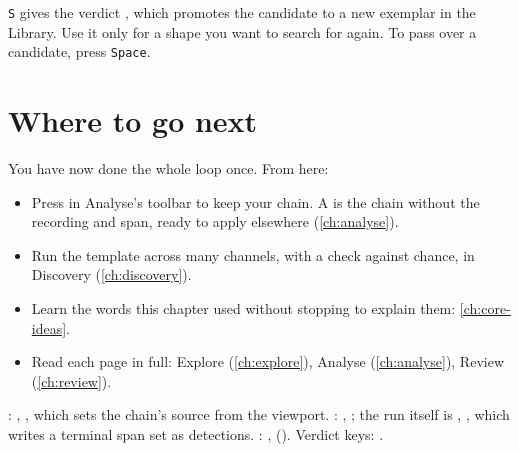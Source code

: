 
\begin{watchout}
\texttt{S} gives the verdict , which promotes the candidate to a new exemplar in
the Library. Use it only for a shape you want to search for again. To pass over a
candidate, press \texttt{Space}.
\end{watchout}

\section{Where to go next}\label{sec:first-session-next}
You have now done the whole loop once. From here:
\begin{itemize}
  \item Press  in Analyse's toolbar to keep your chain. A
     is the chain without the recording and span, ready to apply
    elsewhere (\cref{ch:analyse}).
  \item Run the template across many channels, with a check against chance, in Discovery
    (\cref{ch:discovery}).
  \item Learn the words this chapter used without stopping to explain them:
    \cref{ch:core-ideas}.
  \item Read each page in full: Explore (\cref{ch:explore}), Analyse (\cref{ch:analyse}),
    Review (\cref{ch:review}).
\end{itemize}

\begin{underthehood}
: , ,
which sets the chain's source from the viewport. :
, ; the run itself is
, , which writes a terminal span set as
detections. : ,
 (). Verdict keys:
.
\end{underthehood}
